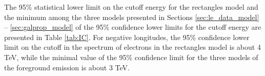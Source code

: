 The 95\% statistical lower limit on the cutoff energy for the rectangles model and the minimum 
among the three models presented in Sections \ref{sec:le_data_model} -- \ref{sec:galprop_model}
of the 95\% confidence lower limits 
for the cutoff energy are presented in Table \ref{tab:IC}.
For negative longitudes,
the 95\% confidence lower limit on the cutoff in the spectrum of electrons in the rectangles model is about 4 TeV,
while the minimal value of the 95\% confidence limit for the three models of the foreground emission is about 3 TeV.

